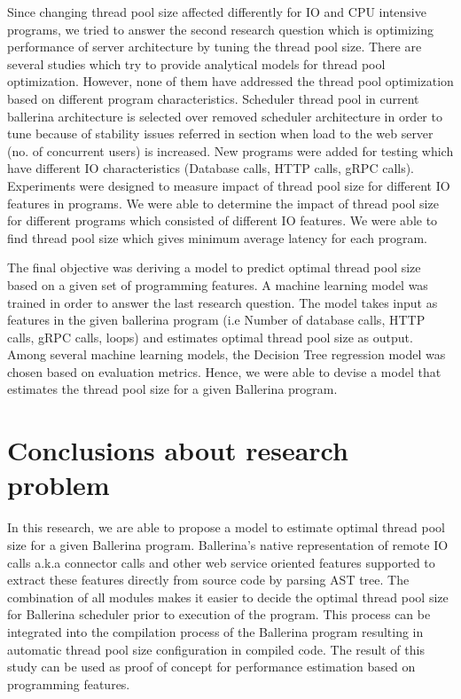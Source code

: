 Since changing thread pool size affected differently for IO and CPU intensive programs, we tried to answer the second research question which is optimizing performance of server architecture by tuning the thread pool size. There are several studies \cite{xu2004performance,thread_pool_analysis,math_aproach_thread_pool_tuning,syer2011identifying,linfeng2017design} which try to provide analytical models for thread pool optimization. However, none of them have addressed the thread pool optimization based on different program characteristics. Scheduler thread pool in current ballerina architecture is selected over removed scheduler architecture in order to tune because of stability issues referred in section when load to the web server (no. of concurrent users) is increased. New programs were added for testing which have different IO characteristics (Database calls, HTTP calls, gRPC calls). Experiments were designed to measure impact of thread pool size for different IO features in programs. We were able to determine the impact of thread pool size for different programs which consisted of different IO features. We were able to find thread pool size which gives minimum average latency for each program.


The final objective was deriving a model to predict optimal thread pool size based on a given set of programming features. A machine learning model was trained in order to answer the last research question. The model takes input as features in the given ballerina program (i.e Number of database calls, HTTP calls, gRPC calls, loops) and estimates optimal thread pool size as output. Among several machine learning models, the Decision Tree regression model was chosen based on evaluation metrics. Hence, we were able to devise a model that estimates the thread pool size for a given Ballerina program.

\section{Conclusions about research problem}

In this research, we are able to propose a model to estimate optimal thread pool size for a given Ballerina program. Ballerina's native representation of remote IO calls a.k.a connector calls and other web service oriented features supported to extract these features directly from source code by parsing AST tree. The combination of all modules makes it easier to decide the optimal thread pool size for Ballerina scheduler prior to execution of the program. This process can be integrated into the compilation process of the Ballerina program resulting in automatic thread pool size configuration in compiled code. The result of this study can be used as proof of concept for performance estimation based on programming features.

